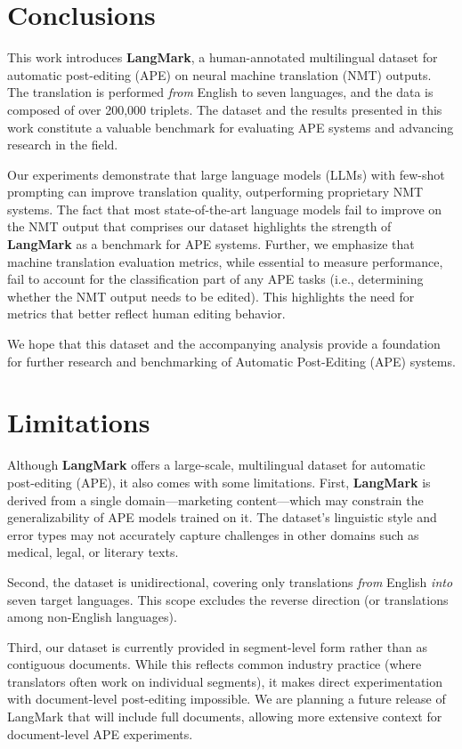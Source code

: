 \documentclass[11pt]{article}
\theoremstyle{plain}
\theoremstyle{definition}
\theoremstyle{remark}
\begin{document}
\section{Conclusions}
This work introduces \textbf{LangMark}, a human-annotated multilingual dataset for automatic post-editing (APE) on neural machine translation (NMT) outputs. The translation is performed {\em from} English to seven languages, and the data is composed of over 200,000 triplets. The dataset and the results presented in this work constitute a valuable benchmark for evaluating APE systems and advancing research in the field.

Our experiments demonstrate that large language models (LLMs) with few-shot prompting can improve translation quality,  outperforming proprietary NMT systems. The fact that most state-of-the-art language models fail to improve on the NMT output that comprises our dataset highlights the strength of \textbf{LangMark} as a benchmark for APE systems. Further, we emphasize that machine translation evaluation metrics, while essential to measure performance, fail to account for the classification part of any APE tasks (i.e., determining whether the NMT output needs to be edited). This highlights the need for metrics that better reflect human editing behavior.

We hope that this dataset and the accompanying analysis provide a foundation for further research and benchmarking of Automatic Post-Editing (APE) systems.


\section*{Limitations}
Although \textbf{LangMark} offers a large-scale, multilingual dataset for automatic post-editing (APE), it also comes with some limitations. First, \textbf{LangMark} is derived from a single domain—marketing content—which may constrain the generalizability of APE models trained on it. The dataset’s linguistic style and error types may not accurately capture challenges in other domains such as medical, legal, or literary texts.

Second, the dataset is unidirectional, covering only translations \emph{from} English \emph{into} seven target languages. This scope excludes the reverse direction (or translations among non-English languages).

Third, our dataset is currently provided in segment-level form rather than as contiguous documents. While this reflects common industry practice (where translators often work on individual segments), it makes direct experimentation with document-level post-editing impossible. We are planning a future release of LangMark that will include full documents, allowing more extensive context for document-level APE experiments.
\end{document}
